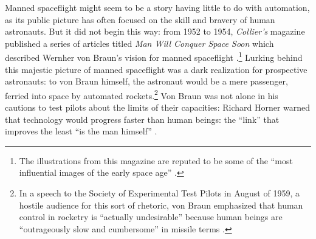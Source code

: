 
Manned spaceflight might seem to be a story having little to do with
automation, as its public picture has often focused on the skill and
bravery of human astronauts. But it did not begin this way: from 1952
to 1954, \emph{Collier's} 
magazine published a series of articles 
titled \emph{Man Will Conquer Space Soon} which described Wernher von
Braun's vision for manned spaceflight
\cite{scribdColliers}.\footnote{The illustrations from this magazine 
  are reputed to be some of the ``most influential images of the early
space age'' \cite[p. 9]{marketingMoon}.} Lurking behind this majestic
picture of manned spaceflight was a dark 
realization for prospective astronauts: to von Braun himself, the
astronaut would be a mere passenger, ferried into space by automated
rockets.\footnote{In a speech to the Society of Experimental Test Pilots in
August of 1959, a hostile audience for this sort of rhetoric, von
Braun emphasized that human control in rocketry is ``actually
undesirable'' because human beings are ``outrageously slow and
cumbersome'' in missile terms \cite[p. 66-67]{DM}.} Von Braun
was not alone in his cautions to
test pilots about the limits of their capacities: Richard Horner
warned that technology would progress
faster than human beings: the ``link'' that improves the least ``is
the man himself'' \cite[p. 19]{DM}. 



